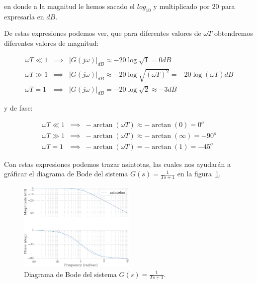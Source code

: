         en donde a la magnitud le hemos sacado el $log_{10}$ y multiplicado por $20$ para expresarla en $dB$.

        De estas expresiones podemos ver, que para diferentes valores de $\omega T$ obtendremos diferentes valores de magnitud:

        \begin{eqnarray*}
            \omega T \ll 1 & \implies & \left| G(j \omega) \right|_{dB} \approx -20 \log{\sqrt{1}} = 0 dB \\
            \omega T \gg 1 & \implies & \left| G(j \omega) \right|_{dB} \approx -20 \log{\sqrt{(\omega T)^2}} = -20 \log{(\omega T)} dB \\
            \omega T = 1 & \implies & \left| G(j \omega) \right|_{dB} = -20 \log{\sqrt{2}} \approx -3 dB
        \end{eqnarray*}

        y de fase:

        \begin{eqnarray*}
            \omega T \ll 1 & \implies & -\arctan{(\omega T)} \approx - \arctan{(0)} = 0^o \\
            \omega T \gg 1 & \implies & -\arctan{(\omega T)} \approx - \arctan{(\infty)} = -90^o \\
            \omega T = 1 & \implies & -\arctan{(\omega T)} = - \arctan{(1)} = -45^o
        \end{eqnarray*}

        Con estas expresiones podemos trazar asintotas,  las cuales nos ayudarán a gráficar el diagrama de Bode del sistema $G(s) = \frac{1}{Ts + 1}$ en la figura~\ref{fig:bodeprimerorden}.

        \begin{figure}
            \centering
            \includegraphics[width=0.5\textwidth]{./imagenes/bodeprimerorden.pdf}
            \caption{\label{fig:bodeprimerorden}Diagrama de Bode del sistema $G(s) = \frac{1}{Ts + 1}$.}
        \end{figure}

